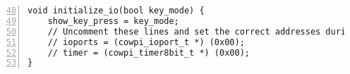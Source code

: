 \renewcommand{\firstline}{48}
\begin{lstlisting}[numberstyle=\color{gray}, numbers=left, firstnumber=\firstline]
void initialize_io(bool key_mode) {
    show_key_press = key_mode;
    // Uncomment these lines and set the correct addresses during lab time
    // ioports = (cowpi_ioport_t *) (0x00);
    // timer = (cowpi_timer8bit_t *) (0x00);
}
\end{lstlisting}
